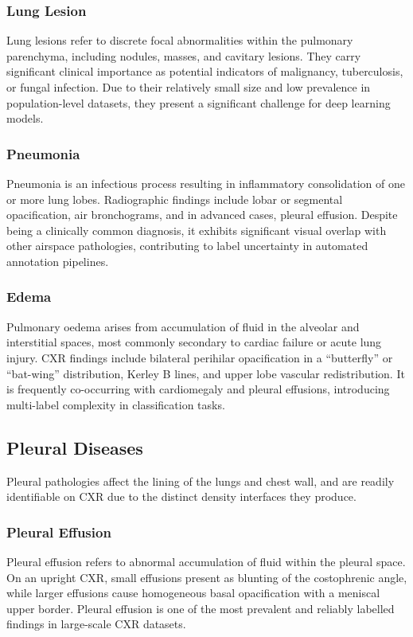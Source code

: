 \subsubsection{Lung Lesion}
Lung lesions refer to discrete focal abnormalities within the pulmonary parenchyma, including nodules, 
masses, and cavitary lesions. They carry significant clinical importance as potential indicators of 
malignancy, tuberculosis, or fungal infection. Due to their relatively small size and low prevalence 
in population-level datasets, they present a significant challenge for deep learning models.

\subsubsection{Pneumonia}
Pneumonia is an infectious process resulting in inflammatory consolidation of one or more lung lobes. 
Radiographic findings include lobar or segmental opacification, air bronchograms, and in advanced cases, 
pleural effusion. Despite being a clinically common diagnosis, it exhibits significant visual overlap with 
other airspace pathologies, contributing to label uncertainty in automated annotation pipelines.

\subsubsection{Edema}
Pulmonary oedema arises from accumulation of fluid in the alveolar and interstitial spaces, most commonly 
secondary to cardiac failure or acute lung injury. CXR findings include bilateral perihilar opacification 
in a ``butterfly'' or ``bat-wing'' distribution, Kerley B lines, and upper lobe vascular redistribution. 
It is frequently co-occurring with cardiomegaly and pleural effusions, introducing multi-label complexity 
in classification tasks.

\subsection{Pleural Diseases}

Pleural pathologies affect the lining of the lungs and chest wall, and are readily identifiable on CXR 
due to the distinct density interfaces they produce.

\subsubsection{Pleural Effusion}
Pleural effusion refers to abnormal accumulation of fluid within the pleural space. On an upright CXR, 
small effusions present as blunting of the costophrenic angle, while larger effusions cause homogeneous 
basal opacification with a meniscal upper border. Pleural effusion is one of the most prevalent and 
reliably labelled findings in large-scale CXR datasets.

